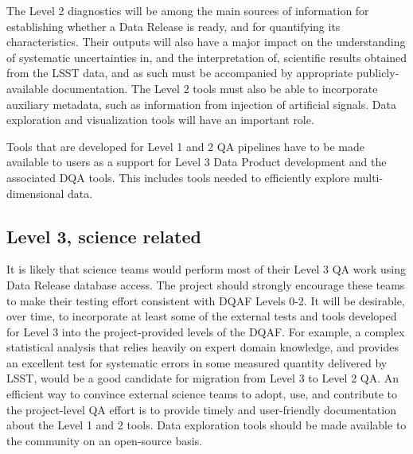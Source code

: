 \documentclass[SE,toc]{lsstdoc}
\begin{document}
The Level 2 diagnostics will be among the main sources of information for establishing
whether a Data Release is ready, and for quantifying its characteristics. Their outputs will also have a
major impact on the understanding of systematic uncertainties in, and the interpretation of, scientific
results obtained from the LSST data, and as such must be accompanied by appropriate publicly-available documentation.
The Level 2 tools must also be able to incorporate auxiliary metadata, such as information
from injection of artificial signals. Data exploration and visualization tools will have
an important role.

Tools that are developed for Level 1 and 2 QA pipelines have to be made available
to users as a support for Level 3 Data Product development and the associated DQA tools.  This includes tools
needed to efficiently explore multi-dimensional data.

\subsection{Level 3, science related}

It is likely that science teams would perform most of their Level 3 QA work using
Data Release database access. The project should strongly encourage these teams
to make their testing effort consistent with DQAF Levels 0-2. It will be desirable, over time, to
incorporate at least some of the external tests and tools developed for Level 3 into the project-provided
levels of the DQAF. For example, a complex
statistical analysis that relies heavily on expert domain knowledge, and provides
an excellent test for systematic errors in some measured quantity delivered by LSST,
would be a good candidate for migration from Level 3 to Level 2 QA.
An efficient way to convince external science teams to adopt, use, and contribute to
the project-level QA effort is to provide timely and user-friendly documentation about the
Level 1 and 2 tools. Data exploration tools should be made available to the community on an open-source basis.
\end{document}
